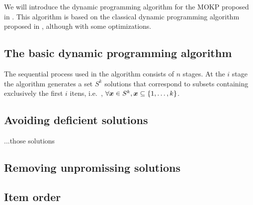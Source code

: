 

We will introduce the dynamic programming algorithm for the MOKP proposed in \cite{bazgan2009}.
This algorithm is based on the classical dynamic programming algorithm proposed in \cite{nemhauser1969discrete},
although with some optimizations.

\subsection{The basic dynamic programming algorithm}
The sequential process used in the algorithm consists of $n$ stages.
At the $i$ stage the algorithm generates a set $S^k$ solutions that correspond
to subsets containing exclusively the first $i$ itens, i.e.\ ,
$\forall\boldsymbol{x} \in S^k, \boldsymbol{x} \subseteq \{1, \ldots, k\}$.



\subsection{Avoiding deficient solutions}

...those solutions

\subsection{Removing unpromissing solutions}

\subsection{Item order}



